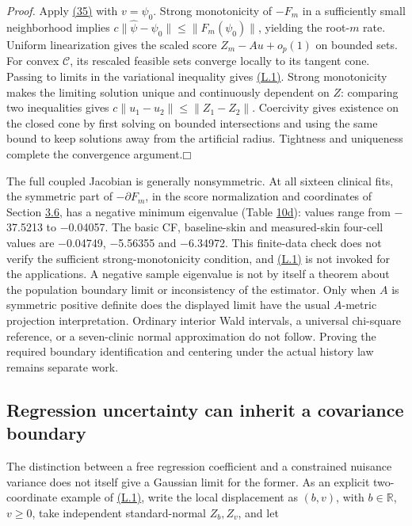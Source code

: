 \documentclass[11pt]{article}
\providecommand{\square}{\mdlgwhtsquare}
\begin{document}
\emph{Proof.} Apply \hyperref[eq:35]{(35)} with \(v=\psi_0\). Strong monotonicity of \(-F_m\) in a sufficiently small neighborhood implies
\(c\|\widehat\psi-\psi_0\|\leq\|F_m(\psi_0)\|\), yielding the root-\(m\) rate. Uniform linearization gives the scaled score \(Z_m-Au+o_p(1)\) on bounded sets. For convex \(\mathcal C\), its rescaled feasible sets converge locally to its tangent cone. Passing to limits in the variational inequality gives \hyperref[eq:L.1]{(L.1)}. Strong monotonicity makes the limiting solution unique and continuously dependent on \(Z\): comparing two inequalities gives \(c\|u_1-u_2\|\leq\|Z_1-Z_2\|\). Coercivity gives existence on the closed cone by first solving on bounded intersections and using the same bound to keep solutions away from the artificial radius. Tightness and uniqueness complete the convergence argument.\hfill$\square$

The full coupled Jacobian is generally nonsymmetric. At all sixteen clinical fits, the symmetric part of \(-\partial F_m\), in the score normalization and coordinates of Section \hyperref[sec:3.6]{3.6}, has a negative minimum eigenvalue (Table \hyperref[tab:10d]{10d}): values range from $-$37.5213 to $-$0.04057. The basic CF, baseline-skin and measured-skin four-cell values are $-$0.04749, $-$5.56355 and $-$6.34972. This finite-data check does not verify the sufficient strong-monotonicity condition, and \hyperref[eq:L.1]{(L.1)} is not invoked for the applications. A negative sample eigenvalue is not by itself a theorem about the population boundary limit or inconsistency of the estimator. Only when \(A\) is symmetric positive definite does the displayed limit have the usual \(A\)-metric projection interpretation. Ordinary interior Wald intervals, a universal chi-square reference, or a seven-clinic normal approximation do not follow. Proving the required boundary identification and centering under the actual history law remains separate work.

\subsection{Regression uncertainty can inherit a covariance boundary}\label{sec:L.1}

The distinction between a free regression coefficient and a constrained nuisance variance does not itself give a Gaussian limit for the former. As an explicit two-coordinate example of \hyperref[eq:L.1]{(L.1)}, write the local displacement as \((b,v)\), with \(b\in\mathbb R\), \(v\geq0\), take independent standard-normal \(Z_b,Z_v\), and let
\end{document}
